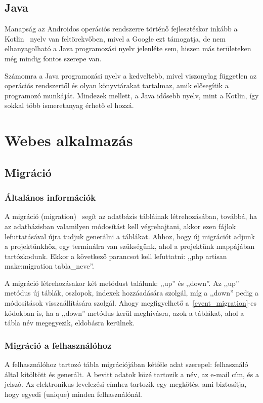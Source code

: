 \documentclass[
]{thesis-ekf}
\theoremstyle{definition}
\theoremstyle{remark}
\begin{document}
	\section{Java}
	Manapság az Androidos operációs rendszerre történő fejlesztéskor inkább a Kotlin~\cite{kotlin_book} nyelv van feltörekvőben, mivel a Google ezt támogatja, de nem elhanyagolható a Java programozási nyelv jelenléte sem, hiszen más területeken még mindig fontos szerepe van. 
	
	Számomra a Java programozási nyelv a kedveltebb, mivel viszonylag független az operációs rendszertől és olyan könyvtárakat tartalmaz, amik elősegítik a programozó munkáját. Mindezek mellett, a Java idősebb nyelv, mint a Kotlin, így sokkal több ismeretanyag érhető el hozzá.
	
	\chapter{Webes alkalmazás}
	\section{Migráció}
	\subsection{Általános információk}
	A migráció (migration)~\cite{laravel_migartion} segít az adatbázis tábláinak létrehozásában, továbbá, ha az adatbázisban valamilyen módosítást kell végrehajtani, akkor ezen fájlok lefuttatásával újra tudjuk generálni a táblákat. Ahhoz, hogy új migrációt adjunk a projektünkhöz, egy terminálra van szükségünk, ahol a projektünk mappájában tartózkodunk. Ekkor a következő parancsot kell lefuttatni: ,,php artisan make:migration tabla\_neve''.
	
	A migráció létrehozásakor két metódust találunk: ,,up'' és ,,down''. Az ,,up'' metódus új táblák, oszlopok, indexek hozzáadására szolgál, míg a ,,down'' pedig a módosítások visszaállítására szolgál. Ahogy megfigyelhető a~\ref{event_migration}-es kódokban is, ha a ,,down'' metódus kerül meghívásra, azok a táblákat, ahol a tábla név megegyezik, eldobásra kerülnek.
	
	\subsection{Migráció a felhasználóhoz}
	A felhasználóhoz tartozó tábla migrációjában kétféle adat szerepel: felhasználó által kitöltött és generált. A bevitt adatok közé tartozik a név, az e-mail cím, és a jelszó. Az elektronikus levelezési címhez tartozik egy megkötés, ami biztosítja, hogy egyedi (unique) minden felhasználónál. 
	
\end{document}
